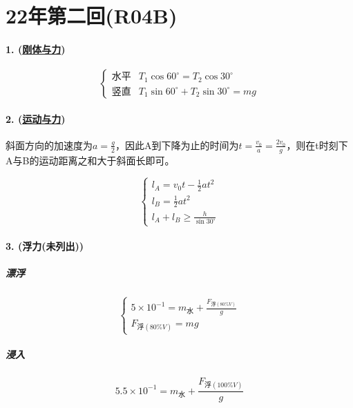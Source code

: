 
\section{22年第二回(R04B)}

\paragraph{1. (\hyperref[subsec:刚体与力]{刚体与力})}

\begin{equation*}
    \begin{cases}
        \textrm{水平}&T_1\cos60^\circ=T_2\cos30^\circ\\
        \textrm{竖直}&T_1\sin60^\circ+T_2\sin30^\circ=mg
    \end{cases}
\end{equation*}

\paragraph{2. (\hyperref[subsec:运动与力]{运动与力})} 斜面方向的加速度为$a=\frac{g}{2}$，因此A到下降为止的时间为$t=\frac{v_0}{a}=\frac{2v_0}{g}$，则在t时刻下A与B的运动距离之和大于斜面长即可。

\begin{equation*}
    \begin{cases}
        l_A=v_0t-\frac12at^2\\
        l_B=\frac12at^2\\
        l_A+l_B\ge \frac{h}{\sin30^\circ}
    \end{cases}
\end{equation*}

\paragraph{3. (浮力(未列出))}

\subparagraph{漂浮}
\begin{equation*}
    \begin{cases}
        5\times10^{-1}=m_\textrm{水}+\frac{F_{\textrm{浮}(80\%V)}}{g}\\
        F_{\textrm{浮}(80\%V)}=mg
    \end{cases}
\end{equation*}

\subparagraph{浸入}
\begin{equation*}
    5.5\times10^{-1}=m_\textrm{水}+\frac{F_{\textrm{浮}(100\%V)}}{g}
\end{equation*}

